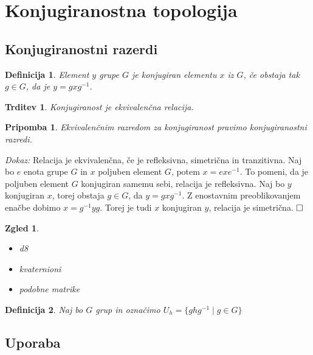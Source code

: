 \documentclass[a4paper,12pt]{article}
\def\qed{$\hfill\Box$}   %
\newtheorem{trditev}{Trditev}
\newtheorem{pripomba}{Pripomba}
\newtheorem{definicija}{Definicija}
\newtheorem{zgled}{Zgled}
\begin{document}
\section{Konjugiranostna topologija}



\subsection{Konjugiranostni razerdi}

\begin{definicija}
    Element $y$ grupe $G$ je konjugiran elementu $x$ iz $G$, če obstaja tak $g \in G$, da je $y = gxg^{-1}$.
\end{definicija}

\begin{trditev}
    Konjugiranost je ekvivalenčna relacija.
\end{trditev}

\begin{pripomba}
    Ekvivalenčnim razredom za konjugiranost pravimo konjugiranostni razredi.
\end{pripomba}

\noindent
{\em Dokaz:\/}
    Relacija je ekvivalenčna, če je refleksivna, simetrična in tranzitivna. Naj bo $e$ enota grupe $G$ in $x$ poljuben element $G$, potem $x = exe^{-1}$.
    To pomeni, da je poljuben element $G$ konjugiran samemu sebi, relacija je refleksivna.
    Naj bo $y$ konjugiran $x$, torej obstaja $g \in G$, da $y = gxg^{-1}$. Z enostavnim preoblikovanjem enačbe dobimo $x = g^{-1}yg$.
    Torej je tudi $x$ konjugiran $y$, relacija je simetrična.
\qed


\begin{zgled}
    \begin{itemize}
        \item d8
        \item kvaternioni
        \item podobne matrike
    \end{itemize}
\end{zgled}

\begin{definicija}
    Naj bo $G$ grup in označimo $U_h = \{ghg^{-1} \mid g \in G \}$
\end{definicija}








\subsection{Uporaba}
\end{document}
